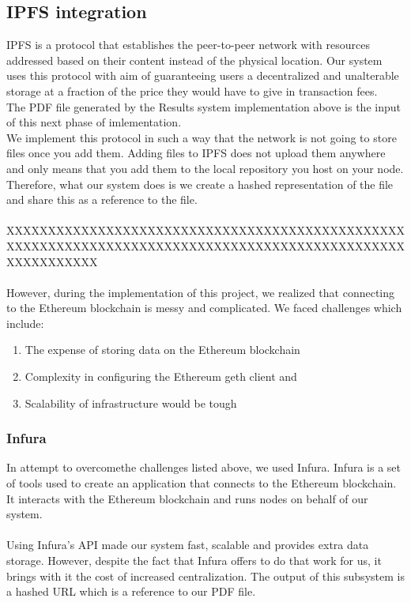 \subsection{IPFS integration}
IPFS is a protocol that establishes the peer-to-peer network with resources addressed based on their content instead of the physical location. Our system uses this protocol with aim of guaranteeing users a decentralized and unalterable storage at a fraction of the price they  would have to give in transaction fees.\\
The PDF file generated by the Results system implementation above is the input of this next phase of imlementation.\\
We implement this protocol in such a way that the network is not going to store files once you add them. Adding files to IPFS does not upload them anywhere and only means that you add them to the local repository you host on your node. Therefore, what our system does is we create a hashed representation of the file and share this as a reference to the file.\\\\
XXXXXXXXXXXXXXXXXXXXXXXXXXXXXXXXXXXXXXXXXXXXXXXXXXXXXXXXXXXXXXXXXXXXXXXXXXXXXXXXXXXXXXXXXXXXXXXXXXXXXXXXXXX
\\\\
However, during the implementation of this project, we realized that connecting to the Ethereum blockchain is messy and complicated. We faced challenges which include:
\begin{enumerate}
\item The expense of storing data on the Ethereum blockchain
\item Complexity in configuring the Ethereum geth client and
\item Scalability of infrastructure would be tough
\end{enumerate}
\subsubsection{Infura}
In attempt to overcomethe challenges listed above, we used Infura. Infura is a set of tools used to create an application that connects to the Ethereum blockchain. It interacts with the Ethereum blockchain and runs nodes on behalf of our system.\\\\
Using Infura's API made our system fast, scalable and provides extra data storage. However, despite the fact that Infura offers to do that work for us, it brings with it the cost of increased centralization.
The output of this subsystem is a hashed  URL which is a reference to our PDF file.

